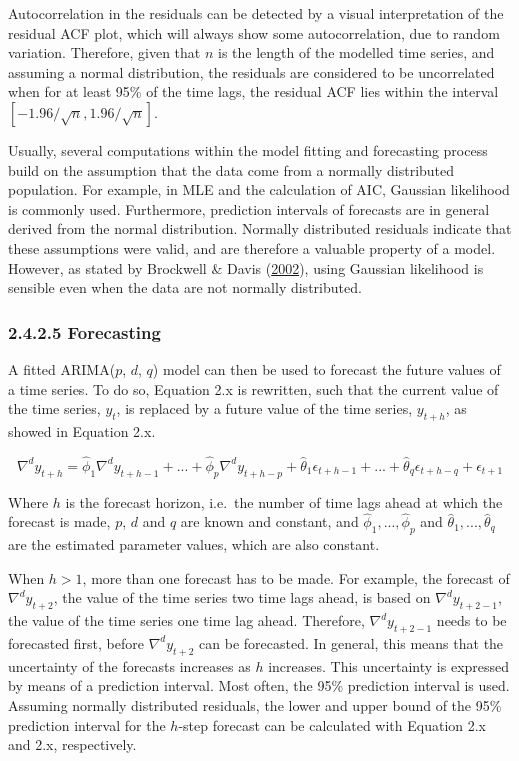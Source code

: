 \documentclass[12pt,oneside]{reedthesis}
\begin{document}
Autocorrelation in the residuals can be detected by a visual
interpretation of the residual ACF plot, which will always show some
autocorrelation, due to random variation. Therefore, given that \(n\) is
the length of the modelled time series, and assuming a normal
distribution, the residuals are considered to be uncorrelated when for
at least 95\% of the time lags, the residual ACF lies within the
interval \([-1.96/\sqrt{n}, 1.96/\sqrt{n}]\).

Usually, several computations within the model fitting and forecasting
process build on the assumption that the data come from a normally
distributed population. For example, in MLE and the calculation of AIC,
Gaussian likelihood is commonly used. Furthermore, prediction intervals
of forecasts are in general derived from the normal distribution.
Normally distributed residuals indicate that these assumptions were
valid, and are therefore a valuable property of a model. However, as
stated by Brockwell \& Davis
(\protect\hyperlink{ref-brockwell2002}{2002}), using Gaussian likelihood
is sensible even when the data are not normally distributed.

\subsubsection{2.4.2.5 Forecasting}\label{forecasting}

A fitted ARIMA(\(p\), \(d\), \(q\)) model can then be used to forecast
the future values of a time series. To do so, Equation 2.x is rewritten,
such that the current value of the time series, \(y_{t}\), is replaced
by a future value of the time series, \(y_{t+h}\), as showed in Equation
2.x.

\[ 
\nabla^{d}y_{t+h} = \hat\phi_{1}\nabla^{d}y_{t+h-1} + ... + \hat\phi_{p}\nabla^{d}y_{t+h-p} +\hat\theta_{1}\epsilon_{t+h-1} + ... + \hat\theta_{q}\epsilon_{t+h-q} + \epsilon_{t+1} 
\]

Where \(h\) is the forecast horizon, i.e.~the number of time lags ahead
at which the forecast is made, \(p\), \(d\) and \(q\) are known and
constant, and \(\hat\phi_{1},...,\hat\phi_{p}\) and
\(\hat\theta_{1},...,\hat\theta_{q}\) are the estimated parameter
values, which are also constant.

When \(h > 1\), more than one forecast has to be made. For example, the
forecast of \(\nabla^{d}y_{t+2}\), the value of the time series two time
lags ahead, is based on \(\nabla^{d}y_{t+2-1}\), the value of the time
series one time lag ahead. Therefore, \(\nabla^{d}y_{t+2-1}\) needs to
be forecasted first, before \(\nabla^{d}y_{t+2}\) can be forecasted. In
general, this means that the uncertainty of the forecasts increases as
\(h\) increases. This uncertainty is expressed by means of a prediction
interval. Most often, the 95\% prediction interval is used. Assuming
normally distributed residuals, the lower and upper bound of the 95\%
prediction interval for the \(h\)-step forecast can be calculated with
Equation 2.x and 2.x, respectively.
\end{document}
